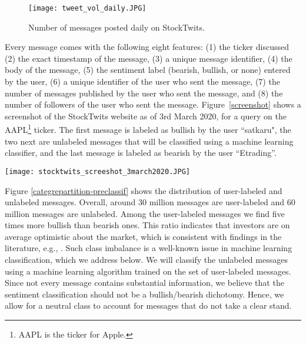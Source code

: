  \begin{figure}
    \centering
    \texttt{[image: tweet\_vol\_daily.JPG]}
    \caption{Number of messages posted daily on StockTwits.}
    \label{fig:tweet_vol_daily}
\end{figure}

Every message comes with the following eight features: (1) the ticker discussed (2) the exact timestamp of the message, (3) a unique message identifier, (4) the body of the message, (5) the sentiment label (bearish, bullish, or none) entered by the user, (6) a unique identifier of the user who sent the message, (7) the number of messages published by the user who sent the message, and (8) the number of followers of the user who sent the message. Figure~\ref{screenshot} shows a screenshot of the StockTwits website as of 3rd March 2020, for a query on the AAPL\footnote{AAPL is the ticker for Apple.} ticker. The first message is labeled as bullish by the user ``satkaru", the two next are unlabeled messages that will be classified using a machine learning classifier, and the last message is labeled as bearish by the user ``Etrading''. 

\begin{figure*}[h]
\centering
\texttt{[image: stocktwits\_screeshot\_3march2020.JPG]}
\caption{Screenshot of StockTwits as of 3rd March 2020. The first message is labeled as bullish by the user ``satkaru", the two next are unlabeled messages that will be classified using a machine learning classifier and the last message is labeled as bearish by the user ``Etrading''.}
\label{screenshot}
\end{figure*}




Figure \ref{categrepartition-preclassif} shows the distribution of user-labeled and unlabeled messages. Overall, around 30 million messages are user-labeled and 60 million messages are unlabeled. Among the user-labeled messages we find five times more bullish than bearish ones. This ratio indicates that investors are on average optimistic about the market, which is consistent with findings in the literature, e.g., \citet{renault2017intraday}. Such class imbalance is a well-known issue in machine learning classification, which we address below. We will classify the unlabeled messages using a machine learning algorithm trained on the set of user-labeled messages. Since not every message contains substantial information, we believe that the sentiment classification should not be a bullish/bearish dichotomy. Hence, we allow for a neutral class to account for messages that do not take a clear stand.


